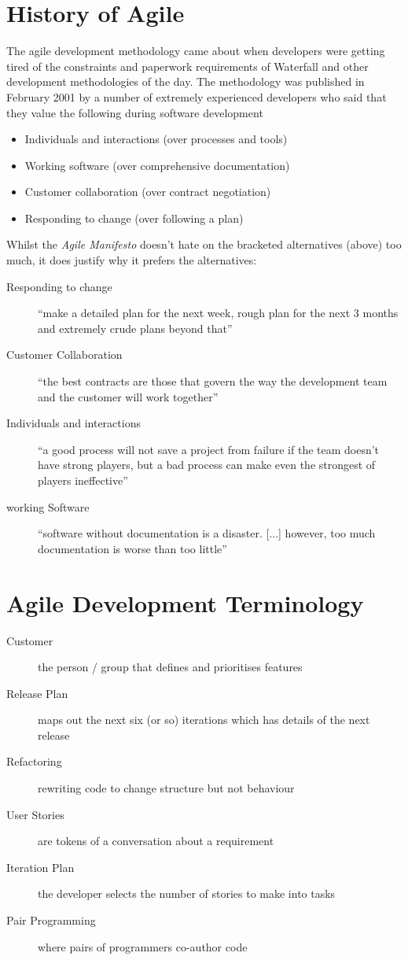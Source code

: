 
\section{History of Agile}
The agile development methodology came about when developers were getting tired of the constraints and paperwork requirements of Waterfall and other development methodologies of the day. The methodology was published in February 2001 by a number of extremely experienced developers who said that they value the following during software development
\begin{itemize}
    \item Individuals and interactions (over processes and tools)
    \item Working software (over comprehensive documentation)
    \item Customer collaboration (over contract negotiation)
    \item Responding to change (over following a plan)
\end{itemize}
Whilst the \textit{Agile Manifesto} doesn't hate on the bracketed alternatives (above) too much, it does justify why it prefers the alternatives:
\begin{description}
    \item[Responding to change] ``make a detailed plan for the next week, rough plan for the next 3 months and extremely crude plans beyond that''
    \item[Customer Collaboration] ``the best contracts are those that govern the way the development team and the customer will work together''
    \item[Individuals and interactions] ``a good process will not save a project from failure if the team doesn't have strong players, but a bad process can make even the strongest of players ineffective''
    \item[working Software] ``software without documentation is a disaster. [...] however, too much documentation is worse than too little''
\end{description}

\section{Agile Development Terminology}
\begin{description}
    \item[Customer] the person / group that defines and prioritises features
    \item[Release Plan] maps out the next six (or so) iterations which has details of the next release
    \item[Refactoring] rewriting code to change structure but not behaviour
    \item[User Stories] are tokens of a conversation about a requirement
    \item[Iteration Plan] the developer selects the number of stories to make into tasks
    \item[Pair Programming] where pairs of programmers co-author code
\end{description}
